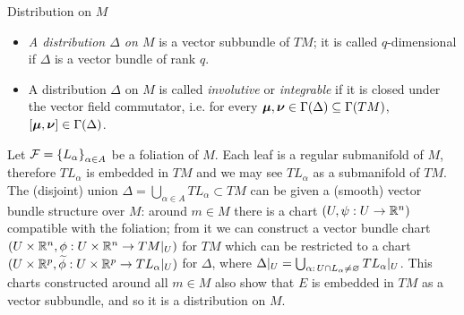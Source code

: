 \begin{definition}{Distribution on $M$}
\begin{itemize}
    \item \emph{A distribution $\Delta$ on $M$} is a vector subbundle of $TM$; it is called $q$-dimensional if $\Delta$ is a vector bundle of rank $q$.
    
    \item A distribution $\Delta$ on $M$ is called \emph{involutive} or \emph{integrable} if it is closed under the vector field commutator, i.e. for every $\bm{\mu}, \bm{\nu} \in \Gamma(\Delta) \subseteq \Gamma(TM)$, $[\bm{\mu}, \bm{\nu}] \in \Gamma(\Delta)$.
\end{itemize}
\end{definition}

Let $\mathcal F = \left\{ L_\alpha \right\}_{\alpha \in A}$ be a foliation of $M$. Each leaf is a regular submanifold of $M$, therefore $T L_\alpha$ is embedded in $TM$ and we may see $T L_\alpha$ as a submanifold of $TM$. The (disjoint) union $\Delta = \bigcup_{\alpha \in A} T L_\alpha \subset TM$ can be given a (smooth) vector bundle structure over $M$: around $m \in M$ there is a chart $(U, \psi:U \to \mathbb{R}^n)$ compatible with the foliation; from it we can construct a vector bundle chart $(U \times \RR^n, \phi: U \times \RR^n \to TM|_{U})$ for $TM$ which can be restricted to a chart $(U \times \RR^p, \tilde{\phi}: U \times \RR^p \to TL_{\alpha}|_{U})$ for $\Delta$, where $\Delta|_U = \bigcup_{\alpha: \, U \cap L_\alpha \neq \varnothing} T L_\alpha|_U$. This charts constructed around all $m\in M$ also show that $E$ is embedded in $TM$ as a vector subbundle, and so it is a distribution on $M$.

